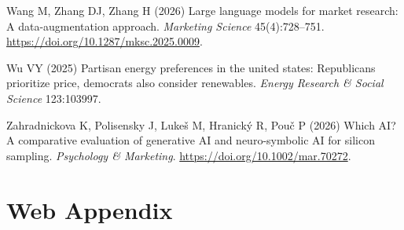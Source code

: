 \documentclass[
  11pt,
  letterpaper,
]{article}
\newlength{\cslhangindent}
\newenvironment{CSLReferences}[2] %
 {\begin{list}{}{%
  \setlength{\itemindent}{0pt}
  \setlength{\leftmargin}{0pt}
  \setlength{\parsep}{0pt}
  \ifodd #1
   \setlength{\leftmargin}{\cslhangindent}
   \setlength{\itemindent}{-1\cslhangindent}
  \fi
  \setlength{\itemsep}{#2\baselineskip}}}
 {\end{list}}
\begin{document}
\begin{CSLReferences}{1}{0}
Wang M, Zhang DJ, Zhang H (2026) Large language models for market
research: A data-augmentation approach. \emph{Marketing Science}
45(4):728--751. \url{https://doi.org/10.1287/mksc.2025.0009}.

Wu VY (2025) Partisan energy preferences in the united states:
Republicans prioritize price, democrats also consider renewables.
\emph{Energy Research \& Social Science} 123:103997.

Zahradnickova K, Polisensky J, Lukeš M, Hranický R, Pouč P (2026) Which
AI? A comparative evaluation of generative AI and neuro-symbolic AI for
silicon sampling. \emph{Psychology \& Marketing}.
\url{https://doi.org/10.1002/mar.70272}.

\end{CSLReferences}

\newpage{}

\section*{Web Appendix}\label{web-appendix}
\end{document}
